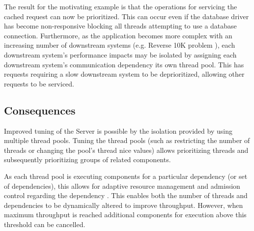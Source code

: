 \documentclass[prodmode]{style/acmlarge}
\begin{document}
\begin{table}[t]
\label{tab:example_request_thread_pools}
\end{table}

The result for the motivating example is that the operations for servicing the
cached request can now be prioritized.  This can occur even if the database
driver has become non-responsive blocking all threads attempting to use a
database connection.  Furthermore, as the application becomes more complex with
an increasing number of downstream systems (e.g. Reverse 10K problem
\cite{reverse-ten-k-problem}), each downstream system's performance impacts may
be isolated by assigning each downstream system's communication dependency its
own thread pool.  This has requests requiring a slow downstream system to be
deprioritized, allowing other requests to be serviced.


\subsection{Consequences}

Improved tuning of the Server is possible by the isolation provided by using
multiple thread pools.  Tuning the thread pools (such as restricting the number
of threads or changing the pool's thread nice values) allows prioritizing
threads and subsequently prioritizing groups of related components.

As each thread pool is executing components for a particular dependency (or set
of dependencies), this allows for adaptive resource management and admission
control regarding the dependency \cite{seda}.  This enables both the number of
threads and dependencies to be dynamically altered to improve throughput.
However, when maximum throughput is reached additional components for execution
above this threshold can be cancelled.
\end{document}
